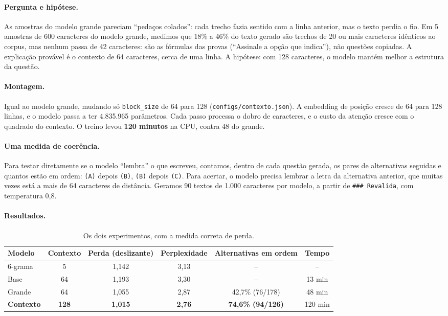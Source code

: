 \paragraph{Pergunta e hipótese.} As amostras do modelo grande pareciam ``pedaços colados'': cada trecho fazia sentido com a linha anterior, mas o texto perdia o fio. Em 5 amostras de 600 caracteres do modelo grande, medimos que 18\% a 46\% do texto gerado são trechos de 20 ou mais caracteres idênticos ao corpus, mas nenhum passa de 42 caracteres: são as fórmulas das provas (``Assinale a opção que indica''), não questões copiadas. A explicação provável é o contexto de 64 caracteres, cerca de uma linha. A hipótese: com 128 caracteres, o modelo mantém melhor a estrutura da questão.

\paragraph{Montagem.} Igual ao modelo grande, mudando só \texttt{block\_size} de 64 para 128 (\texttt{configs/contexto.json}). A embedding de posição cresce de 64 para 128 linhas, e o modelo passa a ter 4.835.965 parâmetros. Cada passo processa o dobro de caracteres, e o custo da atenção cresce com o quadrado do contexto. O treino levou \textbf{120 minutos} na CPU, contra 48 do grande.

\paragraph{Uma medida de coerência.} Para testar diretamente se o modelo ``lembra'' o que escreveu, contamos, dentro de cada questão gerada, os pares de alternativas seguidas e quantos estão em ordem: \texttt{(A)} depois \texttt{(B)}, \texttt{(B)} depois \texttt{(C)}. Para acertar, o modelo precisa lembrar a letra da alternativa anterior, que muitas vezes está a mais de 64 caracteres de distância. Geramos 90 textos de 1.000 caracteres por modelo, a partir de \texttt{\#\#\# Revalida}, com temperatura 0,8.

\paragraph{Resultados.}

\begin{table}[H]
\centering
\small
\begin{tabular}{@{}lccccc@{}}
\toprule
Modelo & Contexto & Perda (deslizante) & Perplexidade & Alternativas em ordem & Tempo \\
\midrule
6-grama & 5 & 1,142 & 3,13 & -- & -- \\
Base & 64 & 1,193 & 3,30 & -- & 13 min \\
Grande & 64 & 1,055 & 2,87 & 42,7\% (76/178) & 48 min \\
\textbf{Contexto} & \textbf{128} & \textbf{1,015} & \textbf{2,76} & \textbf{74,6\% (94/126)} & 120 min \\
\bottomrule
\end{tabular}
\caption{Os dois experimentos, com a medida correta de perda.}
\label{tab:contexto}
\end{table}

